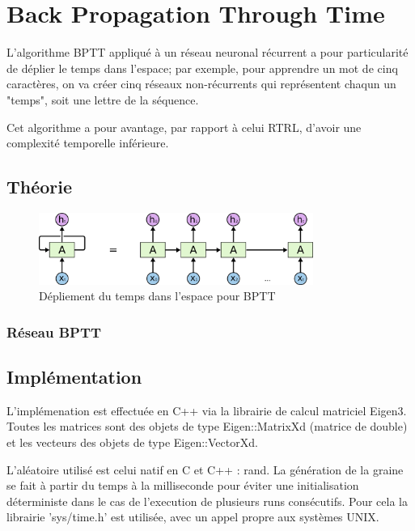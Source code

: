 
\chapter{Back Propagation Through Time}
L'algorithme BPTT appliqué à un réseau neuronal récurrent a pour particularité
de déplier le temps dans l'espace; par exemple, pour apprendre un mot de cinq
caractères, on va créer cinq réseaux non-récurrents qui représentent chaqun un
"temps", soit une lettre de la séquence.

\medskip

Cet algorithme a pour avantage, par rapport à celui RTRL, d'avoir une
complexité temporelle inférieure.

\section{Théorie}

\begin{figure}[!ht]
\begin{center}
\includegraphics[width=0.8\textwidth]{images/bptt.png}
\caption{Dépliement du temps dans l'espace pour BPTT}
\end{center}
\end{figure}


\subsection{Réseau BPTT}

\section{Implémentation}

L'implémenation est effectuée en C++ via la librairie de calcul matriciel
Eigen3. Toutes les matrices sont des objets de type Eigen::MatrixXd (matrice de
double) et les vecteurs des objets de type Eigen::VectorXd.

\medskip

L'aléatoire utilisé est celui natif en C et C++ : rand.
La génération de la graine se fait à partir du temps à la milliseconde pour
éviter une initialisation déterministe dans le cas de l'execution de plusieurs
runs consécutifs. Pour cela la librairie 'sys/time.h' est utilisée, avec un
appel propre aux systèmes UNIX.

